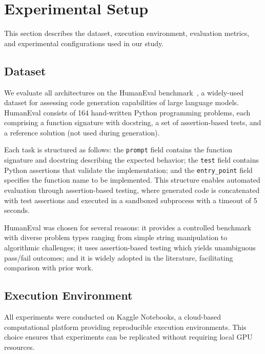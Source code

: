\section{Experimental Setup}
\label{sec:experimental_setup}

This section describes the dataset, execution environment, evaluation metrics, and experimental configurations used in our study.

\subsection{Dataset}
\label{subsec:dataset}

We evaluate all architectures on the HumanEval benchmark~\cite{chen2021humaneval}, a widely-used dataset for assessing code generation capabilities of large language models. HumanEval consists of 164 hand-written Python programming problems, each comprising a function signature with docstring, a set of assertion-based tests, and a reference solution (not used during generation).

Each task is structured as follows: the \texttt{prompt} field contains the function signature and docstring describing the expected behavior; the \texttt{test} field contains Python assertions that validate the implementation; and the \texttt{entry\_point} field specifies the function name to be implemented. This structure enables automated evaluation through assertion-based testing, where generated code is concatenated with test assertions and executed in a sandboxed subprocess with a timeout of 5 seconds.

HumanEval was chosen for several reasons: it provides a controlled benchmark with diverse problem types ranging from simple string manipulation to algorithmic challenges; it uses assertion-based testing which yields unambiguous pass/fail outcomes; and it is widely adopted in the literature, facilitating comparison with prior work.

\subsection{Execution Environment}
\label{subsec:environment}

All experiments were conducted on Kaggle Notebooks, a cloud-based computational platform providing reproducible execution environments. This choice ensures that experiments can be replicated without requiring local GPU resources.

